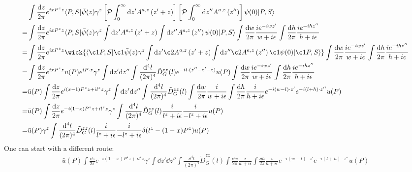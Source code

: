 \documentclass{article}
\newcommand{\mm}[1]{\frac{\dd^4#1}{(2\pi)^4}}
\begin{document}
\begin{align*}
	  & \int \frac{\dd z}{2 \pi} e^{i x P^{z} z}\langle P, S|\bar{\psi}(z) \gamma^z \left[ \mathcal{P} \int_0^{\infty} \dd z^{\prime} A^{a,z}\left(z^{\prime}+z\right) \right]\left[ \mathcal{P} \int_{0}^{\infty} \dd z^{\prime\prime} A^{a,z}\left(z^{\prime\prime}\right) \right]  \psi(0)| P, S\rangle \\
	= & \int \frac{\dd z}{2 \pi} e^{i x P^{z} z}\langle P, S|\bar{\psi}(z) \gamma^z
	\int \dd z^{\prime} A^{a,z}\left(z^{\prime}+z\right)
	\int \dd z^{\prime\prime} A^{a,z}\left(z^{\prime\prime}\right)  \psi(0)| P, S\rangle\int\frac{\dd w}{2\pi}\frac{ie^{-iwz' }}{w+i\epsilon}\int\frac{\dd h}{2\pi}\frac{ie^{-ihz'' }}{h+i\epsilon}\\
	= & \int \frac{\dd z}{2 \pi} e^{i x P^{z} z}\wick{\langle \c1P, S|\c1{\bar{\psi}}(z) \gamma^z
		\int \dd z^{\prime} \c2A^{a,z}\left(z^{\prime}+z\right)
		\int \dd z^{\prime\prime} \c2A^{a,z}\left(z^{\prime\prime}\right)  \c1\psi(0)| \c1P, S\rangle}\int\frac{\dd w}{2\pi}\frac{ie^{-iwz' }}{w+i\epsilon}\int\frac{\dd h}{2\pi}\frac{ie^{-ihz'' }}{h+i\epsilon}\\
	= & \int \frac{\dd z}{2 \pi} e^{i x P^{z} z}\bar u(P)e^{iP\cdot z}\gamma^z\int\dd z'\dd z''\int\mm{l}\tilde D_G^{zz}(l)e^{-il\cdot(z''-z'-z)}u(P)\int\frac{\dd w}{2\pi}\frac{ie^{-iwz' }}{w+i\epsilon}\int\frac{\dd h}{2\pi}\frac{ie^{-ihz'' }}{h+i\epsilon}                                           \\
	= & \bar u(P)\int \frac{\dd z}{2 \pi} e^{i (x-1) P^{z} z+il^zz}\gamma^z\int\dd z'\dd z''\int\mm{l}\tilde D_G^{zz}(l)\int\frac{\dd w}{2\pi}\frac{i}{w+i\epsilon}\int\frac{\dd h}{2\pi}\frac{i}{h+i\epsilon}e^{-i(w-l)\cdot z'}e^{-i(l+h)\cdot z''} u(P)                                                 \\
	= & \bar u(P)\int \frac{\dd z}{2 \pi} e^{-i (1-x) P^{z} z+il^zz}\gamma^z\int\mm{l}\tilde D_G^{zz}(l)\frac{i}{l^z+i\epsilon}\frac{i}{-l^z+i\epsilon} u(P)                                                                                                                                               \\
	= & \bar u(P)\gamma^z\int\mm{l}\tilde D_G^{zz}(l)\frac{i}{l^z+i\epsilon}\frac{i}{-l^z+i\epsilon}\delta(l^z-(1-x)P^z) u(P)
\end{align*}
One can start with a different route:
\begin{align}
	\bar u(P)\int \frac{\dd z}{2 \pi} e^{-i (1-x) P^{z} z+il^zz}\gamma^z\int\dd z'\dd z''\int\mm{l}\tilde D_G^{zz}(l)\int\frac{\dd w}{2\pi}\frac{i}{w+i\epsilon}\int\frac{\dd h}{2\pi}\frac{i}{h+i\epsilon}e^{-i(w-l)\cdot z'}e^{-i(l+h)\cdot z''} u(P)
\end{align}
\end{document}
